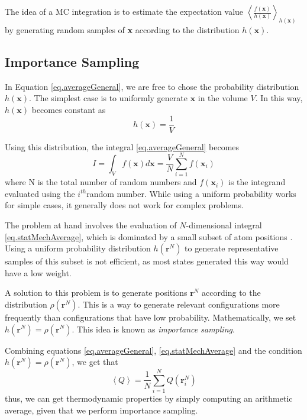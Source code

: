 \documentclass[aip,jcp,preprint,superscriptaddress,floatfix]{revtex4-1}
\begin{document}
 The idea of a MC integration is to estimate the expectation value
 $\left<\frac{f(\textbf{x})}{h(\textbf{x})}\right>_{{h(\textbf{x})}}$ by
 generating random samples of \textbf{x} according to the distribution
 $h(\textbf{x})$. 

\subsection{Importance Sampling}

In Equation \ref{eq.averageGeneral}, we are free to chose the probability
distribution
$h(\textbf{x})$. The simplest case is to uniformly generate $\textbf{x}$
in the volume $V$. In this way, $h(\textbf{x})$ becomes constant as
\begin{equation}
	h(\textbf{x}) = \frac{1}{V}
	\label{eq.uniformDist}
\end{equation}

Using this distribution, the integral \ref{eq.averageGeneral} becomes
\begin{equation}
	I = \int_V f(\textbf{x}) d\textbf{x} = \frac{V}{N} \sum_{i=1}^N
	f(\textbf{x}_i)
	\label{eq.averageUniform}
\end{equation}
where N is the total number of random numbers and $f(\textbf{x}_i)$ is the
integrand evaluated using the $i^{th}$random number. While using a
uniform probability works for simple cases, it generally does not work
for complex problems.

The problem at hand involves the evaluation of $N$-dimensional
integral \ref{eq.statMechAverage}, which is
dominated by a small subset of
atom positions
\cite{Hill.Book}
\cite{McQuarrie.Book}. Using a 
uniform probability distribution $h(\textbf{r}^N)$ to generate
representative samples of this subset is not efficient,
as most states generated this way would have a low weight.

A solution to this problem is to generate positions $\textbf{r}^N$ according to
the distribution $\rho\left(\textbf{r}^N\right)$. This is a way to generate
relevant configurations more frequently than configurations that have low
probability.
Mathematically, we set $h(\textbf{r}^N)=\rho\left(\textbf{r}^N\right)$.
This idea is known as \textit{importance sampling}.

Combining equations \ref{eq.averageGeneral}, \ref{eq.statMechAverage}
and the condition $h(\textbf{r}^N)=\rho\left(\textbf{r}^N\right)$,
we get that
\begin{equation}
	\left<Q\right> = \frac{1}{N} \sum_{i=1}^N Q\left(\textbf{r}_i^N\right)
	\label{eq.importanceSamplingAverage}
\end{equation}
thus, we can get thermodynamic properties by simply computing an arithmetic
average, given
that we perform importance sampling.
\end{document}
